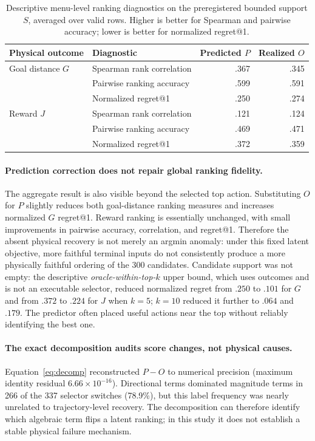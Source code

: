 \documentclass[letterpaper,10pt,conference]{ieeeconf}
\begin{document}
\begin{table}[t]
  \caption{Descriptive menu-level ranking diagnostics on the preregistered
  bounded support $S$, averaged over valid rows. Higher is better for Spearman
  and pairwise accuracy; lower is better for normalized regret@1.}
  \label{tab:ranking}
  \centering
  \scriptsize
  \begin{tabular}{llrr}
    \toprule
    Physical outcome & Diagnostic & Predicted $P$ & Realized $O$ \\
    \midrule
    Goal distance $G$ & Spearman rank correlation & .367 & .345 \\
                      & Pairwise ranking accuracy & .599 & .591 \\
                      & Normalized regret@1 & .250 & .274 \\
    \addlinespace
    Reward $J$        & Spearman rank correlation & .121 & .124 \\
                      & Pairwise ranking accuracy & .469 & .471 \\
                      & Normalized regret@1 & .372 & .359 \\
    \bottomrule
  \end{tabular}
\end{table}

\paragraph{Prediction correction does not repair global ranking fidelity.}
The aggregate result is also visible beyond the selected top action.
Substituting $O$ for $P$ slightly reduces both goal-distance ranking measures
and increases normalized $G$ regret@1. Reward ranking is essentially unchanged,
with small improvements in pairwise accuracy, correlation, and regret@1.
Therefore the absent physical recovery is not merely an argmin anomaly: under
this fixed latent objective, more faithful terminal inputs do not consistently
produce a more physically faithful ordering of the 300 candidates.
Candidate support was not empty: the descriptive
\emph{oracle-within-top-$k$} upper bound, which uses outcomes and is not an
executable selector, reduced normalized regret from $.250$ to $.101$ for $G$
and from $.372$ to $.224$ for $J$ when $k=5$; $k=10$ reduced it further to
$.064$ and $.179$. The predictor often placed useful actions near the top
without reliably identifying the best one.

\paragraph{The exact decomposition audits score changes, not physical causes.}
Equation~\ref{eq:decomp} reconstructed $P-O$ to numerical precision (maximum
identity residual $6.66\times10^{-16}$). Directional terms dominated magnitude
terms in 266 of the 337 selector switches (78.9\%), but this label frequency was
nearly unrelated to trajectory-level recovery. The decomposition can therefore
identify which algebraic term flips a latent ranking; in this study it does not
establish a stable physical failure mechanism.
\end{document}
